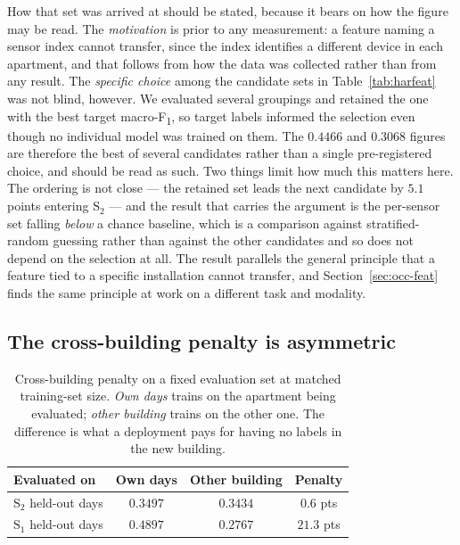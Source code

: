 \documentclass[a4paper,fleqn]{cas-dc}
\newcommand{\macf}{macro-F\textsubscript{1}}
\begin{document}
How that set was arrived at should be stated, because it bears on how the figure may be
read. The \emph{motivation} is prior to any measurement: a feature naming a sensor index
cannot transfer, since the index identifies a different device in each apartment, and that
follows from how the data was collected rather than from any result. The \emph{specific
choice} among the candidate sets in Table~\ref{tab:harfeat} was not blind, however. We
evaluated several groupings and retained the one with the best target \macf, so target
labels informed the selection even though no individual model was trained on them. The
$0.4466$ and $0.3068$ figures are therefore the best of several candidates rather than a
single pre-registered choice, and should be read as such. Two things limit how much this
matters here. The ordering is not close --- the retained set leads the next candidate by
$5.1$ points entering $\text{S}_2$ --- and the result that carries the argument is the
per-sensor set falling \emph{below} a chance baseline, which is a comparison against
stratified-random guessing rather than against the other candidates and so does not depend
on the selection at all. The result parallels
the general principle that a feature tied to a specific installation cannot transfer, and
Section~\ref{sec:occ-feat} finds the same principle at work on a different task and
modality.

\subsection{The cross-building penalty is asymmetric}
\label{sec:har-gap}

\begin{table}[t]
\centering
\caption{Cross-building penalty on a fixed evaluation set at matched training-set size.
\emph{Own days} trains on the apartment being evaluated; \emph{other building} trains on
the other one. The difference is what a deployment pays for having no labels in the new
building.}
\label{tab:hargap}
\small
\begin{tabular}{@{}lccc@{}}
\toprule
Evaluated on & Own days & Other building & Penalty \\
\midrule
$\text{S}_2$ held-out days & $0.3497$ & $0.3434$ & $\mathbf{0.6}$ pts \\
$\text{S}_1$ held-out days & $0.4897$ & $0.2767$ & $21.3$ pts \\
\bottomrule
\end{tabular}
\end{table}
\end{document}
